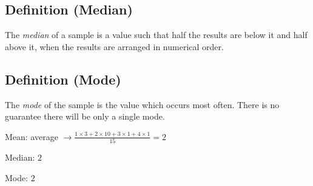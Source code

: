 \begin{defbox}
    \subsection{Definition (Median)}
    The \emph{median} of a sample is a value such that half the results are 
    below it and half above it, when the results are arranged in numerical 
    order.
\end{defbox}

\begin{defbox}
    \subsection{Definition (Mode)}
    The \emph{mode} of the sample is the value which occurs most often. There
    is no guarantee there will be only a single mode.
\end{defbox}
Mean: average $ \rightarrow
\frac{1\times 3+2\times 10+3\times 1+4\times 1}{15}=2 $

Median: $ 2 $

Mode: $ 2 $